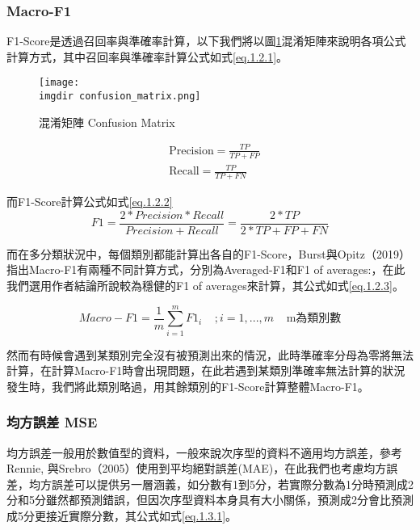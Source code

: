 \subsubsection{Macro-F1}

	F1-Score是透過召回率與準確率計算，以下我們將以圖\ref{grap.3.1.1}混淆矩陣來說明各項公式計算方式，其中召回率與準確率計算公式如式\ref{eq.1.2.1}。
	
	\begin{figure}[H]
    \centering
        \texttt{[image: \\imgdir confusion\_matrix.png]}
    \caption{混淆矩陣 Confusion Matrix}
    \label{grap.3.1.1}
    
\end{figure}
\begin{equation}\label{eq.1.2.1}
\begin{aligned}
&\text{Precision} = \frac{TP}{TP+FP}  \\
&\text{Recall} = \frac{TP}{TP+FN}
\end{aligned}
\end{equation}

	而F1-Score計算公式如式\ref{eq.1.2.2}
\begin{equation}\label{eq.1.2.2}
	F1 = \frac{2*Precision*Recall}{Precision+Recall} = \frac{2*TP}{2*TP+FP+FN}
\end{equation}

	而在多分類狀況中，每個類別都能計算出各自的F1-Score，Burst與Opitz（2019）指出Macro-F1有兩種不同計算方式，分別為Averaged-F1和F1 of averages:，在此我們選用作者結論所說較為穩健的F1 of averages來計算，其公式如式\ref{eq.1.2.3}。

\begin{equation}\label{eq.1.2.3}
Macro-F1 =\frac{1}{m}\sum_{i=1}^{m} F1_i \;\;\;\; ; i=1,...,m\;\;\;\;\text{m為類別數}
\end{equation}
	
	然而有時候會遇到某類別完全沒有被預測出來的情況，此時準確率分母為零將無法計算，在計算Macro-F1時會出現問題，在此若遇到某類別準確率無法計算的狀況發生時，我們將此類別略過，用其餘類別的F1-Score計算整體Macro-F1。


\subsubsection{均方誤差 MSE}

	均方誤差一般用於數值型的資料，一般來說次序型的資料不適用均方誤差，參考Rennie, 與Srebro（2005）使用到平均絕對誤差(MAE)，在此我們也考慮均方誤差，均方誤差可以提供另一層涵義，如分數有1到5分，若實際分數為1分時預測成2分和5分雖然都預測錯誤，但因次序型資料本身具有大小關係，預測成2分會比預測成5分更接近實際分數，其公式如式\ref{eq.1.3.1}。
	
